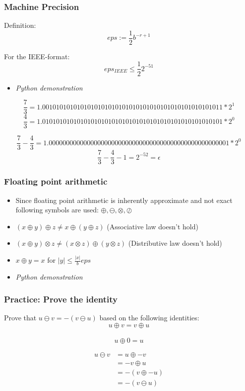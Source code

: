 \documentclass{beamer}
\begin{document}
\begin{frame}
\frametitle{Machine Precision}
Definition:
$$eps := \frac{1}{2}b^{-r+1}$$

For the IEEE-format:
$$eps_{IEEE} \leq \frac{1}{2}2^{-51}$$

\begin{itemize}
\item \textit{Python demonstration}
\end{itemize}
\pause


$$\frac{7}{3} = 1.0010101010101010101010101010101010101010101010101011*2^1$$
 $$\frac{4}{3} = 1.0101010101010101010101010101010101010101010101010101*2^0$$

$$\frac{7}{3} -\frac{4}{3} =  1.0000000000000000000000000000000000000000000000000001*2^0$$
$$\frac{7}{3} -\frac{4}{3} - 1 = 2^{-52} = \epsilon$$



\end{frame}

\begin{frame}
\frametitle{Floating point arithmetic}
\begin{itemize}
\item Since floating point arithmetic is inherently approximate and not exact following symbols are used: $\oplus,\ominus, \otimes,\oslash$
\item  $(x \oplus y) \oplus z \neq x \oplus (y \oplus z) $ (Associative law doesn't hold)
\item $(x \oplus y) \otimes z \neq (x \otimes z) \oplus (y \otimes z) $ (Distributive law doesn't hold)
\item $x \oplus y = x$ for $|y| \leq \frac{|x|}{b}eps$
\item \textit{Python demonstration}
\end{itemize}
\end{frame}


\begin{frame}
\frametitle{Practice: Prove the identity}

Prove that $u \ominus v = -(v \ominus u)$ based on the following identities:
$$u \oplus v = v \oplus u$$\\
$$u \oplus 0 = u $$


\pause

\begin{align}
u \ominus v &= u \oplus -v\\
&= -v \oplus u \\
&= - (v \oplus -u)\\
&= -(v \ominus u)
\end{align}

\end{frame}
\end{document}
